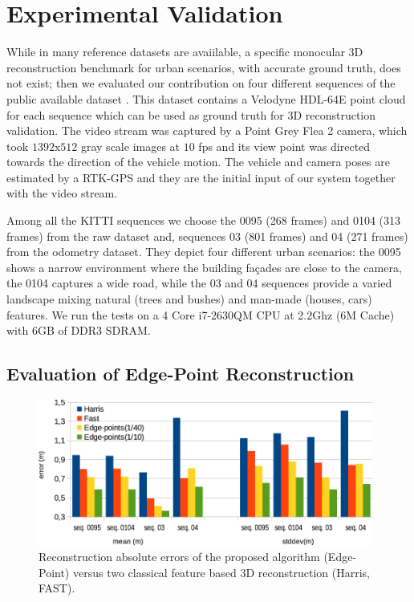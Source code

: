 \section{Experimental Validation}
While in \mvs many reference datasets are avaiilable, a specific monocular 3D reconstruction benchmark for urban scenarios, with accurate ground truth, does not exist; then we evaluated our contribution on four different sequences of the public available dataset \cite{Geiger_et_al12}. 
This dataset contains a Velodyne HDL-64E point cloud for each sequence which can be used as ground truth for 3D reconstruction validation.
The video stream was captured by a Point Grey Flea 2 camera, which took $1392\text{x}512$ gray scale images at $10$ fps and its view point was directed towards the direction of the vehicle motion. 
The vehicle and camera poses are estimated by a RTK-GPS and they are the initial input of our system together with the video stream.

Among all the KITTI sequences we choose the 0095 (268 frames) and 0104 (313 frames) from the raw dataset and, sequences 03 (801 frames) and 04 (271 frames) from the odometry dataset. 
They depict four different urban scenarios: the 0095 shows a narrow environment where the building fa\c{c}ades are close to the camera, the 0104 captures a wide road, while the 03 and 04 sequences provide a varied landscape mixing natural (trees and bushes) and man-made (houses, cars) features.
We run the tests on a 4 Core i7-2630QM CPU at 2.2Ghz (6M Cache) with 6GB of DDR3 SDRAM.
\subsection{Evaluation of Edge-Point Reconstruction}
\label{sec:experimental-results}
\begin{figure}[t]
  \centering
  \includegraphics[width=0.98\textwidth]{./img/risultati.pdf}
  \caption{Reconstruction absolute errors of the proposed algorithm (Edge-Point) versus two classical feature based 3D reconstruction (Harris, FAST).}
   \label{tab:comp}
\end{figure}

